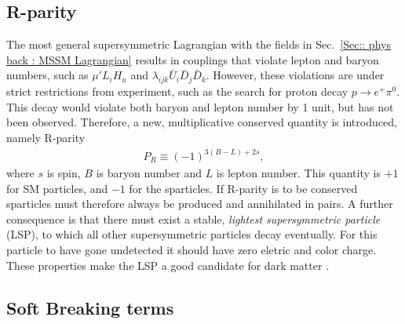 \documentclass[twoside,english]{uiofysmaster}
\begin{document}
{\subsection{R-parity}

The most general supersymmetric Lagrangian with the fields in Sec.~\ref{Sec:: phys back : MSSM Lagrangian} results in couplings that violate lepton and baryon numbers, such as $\mu' L_i H_u$ and $ \lambda_{ijk} \bar{U}_i \bar{D}_j \bar{D}_k $. However, these violations are under strict restrictions from experiment, such as the search for proton decay $p \rightarrow e^+ \pi^0$. This decay would violate both baryon and lepton number by 1 unit, but has not been observed. Therefore, a new, multiplicative conserved quantity is introduced, namely R-parity
\begin{align}\label{Eq:: R-parity}
P_R \equiv (-1)^{3(B-L) +2s},
\end{align}
where $s$ is spin, $B$ is baryon number and $L$ is lepton number. This quantity is $+1$ for SM particles, and $-1$ for the sparticles. If R-parity is to be conserved sparticles must therefore always be produced and annihilated in pairs. A further consequence is that there must exist a stable, \textit{lightest supersymmetric particle} (LSP), to which all other supersymmetric particles decay eventually. For this particle to have gone undetected it should have zero eletric and color charge. These properties make the LSP a good candidate for dark matter \cite{weinberg_1995}.

\subsection{Soft Breaking terms}

}
\end{document}
